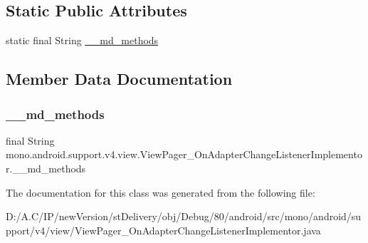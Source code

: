 \subsection*{Static Public Attributes}
\begin{DoxyCompactItemize}
\item 
static final String \hyperlink{classmono_1_1android_1_1support_1_1v4_1_1view_1_1_view_pager___on_adapter_change_listener_implementor_a4159f6e0c54d8a9a269b8b2624c37a5a}{\+\_\+\+\_\+md\+\_\+methods}
\end{DoxyCompactItemize}


\subsection{Member Data Documentation}
\mbox{\label{classmono_1_1android_1_1support_1_1v4_1_1view_1_1_view_pager___on_adapter_change_listener_implementor_a4159f6e0c54d8a9a269b8b2624c37a5a}} 
\subsubsection{\texorpdfstring{\+\_\+\+\_\+md\+\_\+methods}{\_\_md\_methods}}
{\footnotesize\ttfamily final String mono.\+android.\+support.\+v4.\+view.\+View\+Pager\+\_\+\+On\+Adapter\+Change\+Listener\+Implementor.\+\_\+\+\_\+md\+\_\+methods\hspace{0.3cm}{\ttfamily [static]}}



The documentation for this class was generated from the following file\+:\begin{DoxyCompactItemize}
\item 
D\+:/\+A.\+C/\+I\+P/new\+Version/st\+Delivery/obj/\+Debug/80/android/src/mono/android/support/v4/view/View\+Pager\+\_\+\+On\+Adapter\+Change\+Listener\+Implementor.\+java\end{DoxyCompactItemize}
